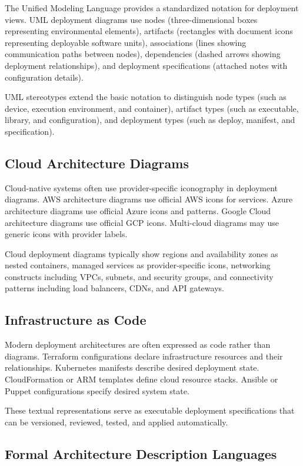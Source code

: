 \documentclass[11pt]{article}
\begin{document}
The Unified Modeling Language provides a standardized notation for deployment views. UML deployment diagrams use nodes (three-dimensional boxes representing environmental elements), artifacts (rectangles with document icons representing deployable software units), associations (lines showing communication paths between nodes), dependencies (dashed arrows showing deployment relationships), and deployment specifications (attached notes with configuration details).

UML stereotypes extend the basic notation to distinguish node types (such as device, execution environment, and container), artifact types (such as executable, library, and configuration), and deployment types (such as deploy, manifest, and specification).

\subsection{Cloud Architecture Diagrams}

Cloud-native systems often use provider-specific iconography in deployment diagrams. AWS architecture diagrams use official AWS icons for services. Azure architecture diagrams use official Azure icons and patterns. Google Cloud architecture diagrams use official GCP icons. Multi-cloud diagrams may use generic icons with provider labels.

Cloud deployment diagrams typically show regions and availability zones as nested containers, managed services as provider-specific icons, networking constructs including VPCs, subnets, and security groups, and connectivity patterns including load balancers, CDNs, and API gateways.

\subsection{Infrastructure as Code}

Modern deployment architectures are often expressed as code rather than diagrams. Terraform configurations declare infrastructure resources and their relationships. Kubernetes manifests describe desired deployment state. CloudFormation or ARM templates define cloud resource stacks. Ansible or Puppet configurations specify desired system state.

These textual representations serve as executable deployment specifications that can be versioned, reviewed, tested, and applied automatically.

\subsection{Formal Architecture Description Languages}
\end{document}

